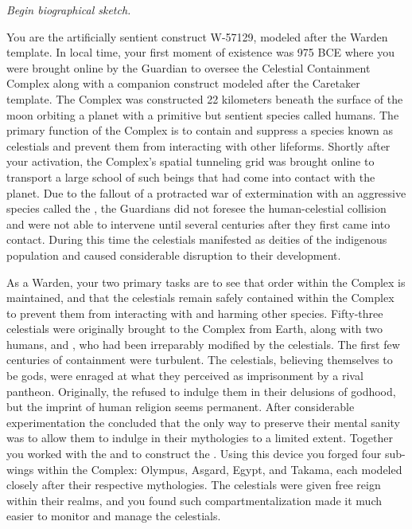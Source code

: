 \documentclass[char]{guardians}
\begin{document}
\name{\cWarden{}}

\emph{Begin biographical sketch.}

You are the artificially sentient construct W-57129, modeled after the Warden template. In local time, your first moment of existence was 975 BCE where you were brought online by the Guardian \cJascha{\intro} to oversee the Celestial Containment Complex along with a companion construct modeled after the Caretaker template. The Complex was constructed 22 kilometers beneath the surface of the moon orbiting a planet with a primitive but sentient species called humans. The primary function of the Complex is to contain and suppress a species known as celestials and prevent them from interacting with other lifeforms. Shortly after your activation, the Complex's spatial tunneling grid was brought online to transport a large school of such beings that had come into contact with the planet. Due to the fallout of a protracted war of extermination with an aggressive species called the \evilRace{}, the Guardians did not foresee the human-celestial collision and were not able to intervene until several centuries after they first came into contact. During this time the celestials manifested as deities of the indigenous population and caused considerable disruption to their development.

As a Warden, your two primary tasks are to see that order within the Complex is maintained, and that the celestials remain safely contained within the Complex to prevent them from interacting with and harming other species. Fifty-three celestials were originally brought to the Complex from Earth, along with two humans, \cPandora{} and \cEgyptianHuman{}, who had been irreparably modified by the celestials. The first few centuries of containment were turbulent. The celestials, believing themselves to be gods, were enraged at what they perceived as imprisonment by a rival pantheon. Originally, the \cCaretaker{} refused to indulge them in their delusions of godhood, but the imprint of human religion seems permanent. After considerable experimentation the \cCaretaker{} concluded that the only way to preserve their mental sanity was to allow them to indulge in their mythologies to a limited extent. Together you worked with the \cCaretaker{} and \cJascha{} to construct the \stone{}. Using this device you forged four sub-wings within the Complex: Olympus, Asgard, Egypt, and Takama, each modeled closely after their respective mythologies. The celestials were given free reign within their realms, and you found such compartmentalization made it much easier to monitor and manage the celestials.
\end{document}
